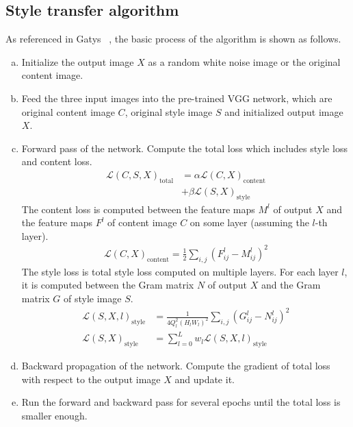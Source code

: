 \documentclass[10pt,twocolumn,letterpaper]{article}
\begin{document}
\subsection{Style transfer algorithm \cite{Authors01}}
\noindent As referenced in Gatys \etal~\cite{Authors01}, the basic process of the algorithm is shown as follows.
\begin{enumerate}[a.]
    \item Initialize the output image $X$ as a random white noise image or the original content image.
    \item Feed the three input images into the pre-trained VGG network, which are original content image $C$, original style image $S$ and initialized output image $X$.
    \item Forward pass of the network. Compute the total loss which includes style loss and content loss.
    \begin{align}
    \mathcal{L}(C,S,X)_{\text{total}} &= \alpha \mathcal{L}(C,X)_{\text{content}}\nonumber\\ &+ \beta \mathcal{L}(S,X)_{\text{style}}
\end{align}
The content loss is computed between the feature maps $M^l$ of output $X$ and the feature maps $F^l$ of content image $C$ on some layer (assuming the $l$-th layer).
\begin{align}
    \mathcal{L}(C,X)_{\text{content}} = \frac{1}{2}\sum_{i,j}{(F_{ij}^l - M_{ij}^l)^2}
\end{align}
The style loss is total style loss computed on multiple layers. For each layer $l$, it is computed between the Gram matrix $N$ of output $X$ and the Gram matrix $G$ of style image $S$.
\begin{align}
\mathcal{L}(S,X,l)_{\text{style}} &= \frac{1}{4Q_l^2(H_lW_l)^2}\sum_{i,j}(G_{ij}^l-N_{ij}^l)^2\\
    \mathcal{L}(S,X)_{\text{style}} &= \sum_{l=0}^L w_l \mathcal{L}(S,X,l)_{\text{style}}
\end{align}
\item Backward propagation of the network. Compute the gradient of total loss with respect to the output image $X$ and update it.
\item Run the forward and backward pass for several epochs until the total loss is smaller enough.
    
\end{enumerate}


\end{document}
